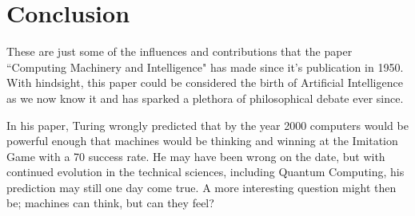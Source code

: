 \documentclass{scrartcl}
\begin{document}
\section{Conclusion}
These are just some of the influences and contributions that the paper \textquotedblleft Computing Machinery and Intelligence" has made since it's publication in 1950. With hindsight, this paper could be considered the birth of Artificial Intelligence as we now know it and has sparked a plethora of philosophical debate ever since. \par
In his paper, Turing wrongly predicted that by the year 2000 computers would be powerful enough that machines would be thinking and winning at the Imitation Game with a 70  success rate. He may have been wrong on the date, but with continued evolution in the technical sciences, including Quantum Computing, his prediction may still one day come true. A more interesting question might then be; machines can think, but can they feel?









\end{document}
